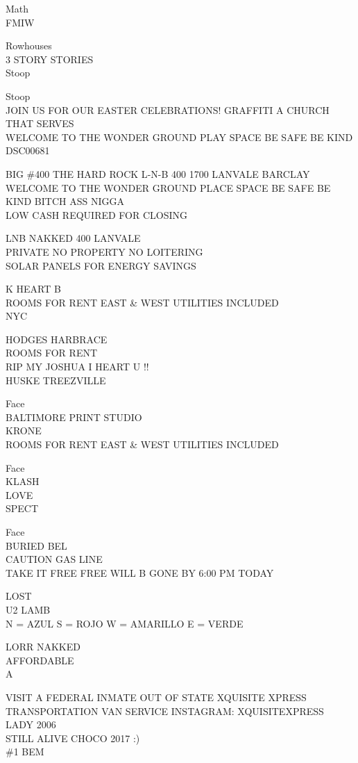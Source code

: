 \documentclass[10pt,letterpaper]{article}
\begin{document}
Math\\
FMIW

Rowhouses\\
3 STORY STORIES\\
Stoop

Stoop\\
JOIN US FOR OUR EASTER CELEBRATIONS!  GRAFFITI A CHURCH THAT SERVES\\
WELCOME TO THE WONDER GROUND PLAY SPACE BE SAFE BE KIND\\
DSC00681

BIG \#400 THE HARD ROCK L{-}N{-}B 400 1700 LANVALE BARCLAY\\
WELCOME TO THE WONDER GROUND PLACE SPACE BE SAFE BE KIND BITCH ASS NIGGA\\
LOW CASH REQUIRED FOR CLOSING

LNB NAKKED 400 LANVALE\\
PRIVATE NO PROPERTY NO LOITERING\\
SOLAR PANELS FOR ENERGY SAVINGS

K HEART B\\
ROOMS FOR RENT EAST \& WEST UTILITIES INCLUDED\\
NYC

HODGES HARBRACE\\
ROOMS FOR RENT\\
RIP MY JOSHUA I HEART U !!\\
HUSKE TREEZVILLE

Face\\
BALTIMORE PRINT STUDIO\\
KRONE\\
ROOMS FOR RENT EAST \& WEST UTILITIES INCLUDED

Face\\
KLASH\\
LOVE\\
SPECT

Face\\
BURIED BEL\\
CAUTION GAS LINE\\
TAKE IT FREE FREE WILL B GONE BY 6:00 PM TODAY

LOST\\
U2 LAMB\\
N = AZUL S = ROJO W = AMARILLO E = VERDE

LORR NAKKED\\
AFFORDABLE\\
A

VISIT A FEDERAL INMATE OUT OF STATE XQUISITE XPRESS TRANSPORTATION VAN SERVICE  INSTAGRAM: XQUISITEXPRESS\\
LADY 2006\\
STILL ALIVE CHOCO 2017 :)\\
\#1 BEM
\end{document}
